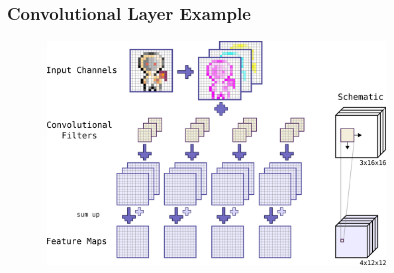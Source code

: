 \begin{frame}
  \frametitle{Convolutional Layer Example}
  \vspace{0.2cm}
  \begin{figure} \includegraphics[width=0.8\textwidth]{./figs/nn_theory_cnn_basics.png} \end{figure}
\end{frame}

